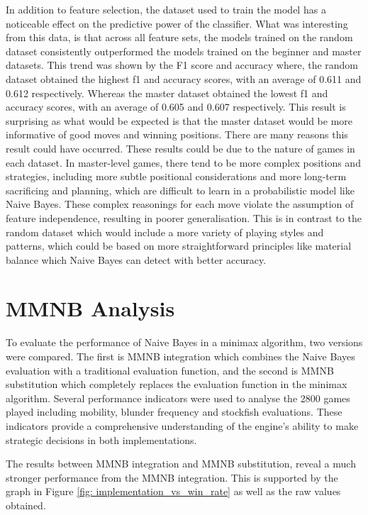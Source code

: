 In addition to feature selection, the dataset used to train the model has a noticeable effect on the predictive power of the classifier. What was interesting from this data, is that across all feature sets, the models trained on the random dataset consistently outperformed the models trained on the beginner and master datasets. This trend was shown by the F1 score and accuracy where, the random dataset obtained the highest f1 and accuracy scores, with an average of 0.611 and 0.612 respectively. Whereas the master dataset obtained the lowest f1 and accuracy scores, with an average of 0.605 and 0.607 respectively. This result is surprising as what would be expected is that the master dataset would be more informative of good moves and winning positions. There are many reasons this result could have occurred. These results could be due to the nature of games in each dataset. In master-level games, there tend to be more complex positions and strategies, including more subtle positional considerations and more long-term sacrificing and planning, which are difficult to learn in a probabilistic model like Naive Bayes. These complex reasonings for each move violate the assumption of feature independence, resulting in poorer generalisation. This is in contrast to the random dataset which would include a more variety of playing styles and patterns, which could be based on more straightforward principles like material balance which Naive Bayes can detect with better accuracy.


\section{MMNB Analysis}

To evaluate the performance of Naive Bayes in a minimax algorithm, two versions were compared. The first is MMNB integration which combines the Naive Bayes evaluation with a traditional evaluation function, and the second is MMNB substitution which completely replaces the evaluation function in the minimax algorithm. Several performance indicators were used to analyse the 2800 games played including mobility, blunder frequency and stockfish evaluations. These indicators provide a comprehensive understanding of the engine's ability to make strategic decisions in both implementations.


The results between MMNB integration and MMNB substitution, reveal a much stronger performance from the MMNB integration. This is supported by the graph in Figure \ref{fig: implementation_vs_win_rate} as well as the raw values obtained.

